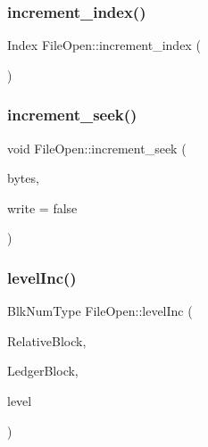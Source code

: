 \mbox{\label{class_file_open_abd29158f55f135ada0c5a0f25ee5ace6}} 
\subsubsection{\texorpdfstring{increment\+\_\+index()}{increment\_index()}}
{\footnotesize\ttfamily Index File\+Open\+::increment\+\_\+index (\begin{DoxyParamCaption}{ }\end{DoxyParamCaption})}

\mbox{\label{class_file_open_a8b178b10d2081d8c64a1218f11b9265a}} 
\subsubsection{\texorpdfstring{increment\+\_\+seek()}{increment\_seek()}}
{\footnotesize\ttfamily void File\+Open\+::increment\+\_\+seek (\begin{DoxyParamCaption}\item[{size\+\_\+t}]{bytes,  }\item[{bool}]{write = {\ttfamily false} }\end{DoxyParamCaption})}

\mbox{\label{class_file_open_a74e35be92bea88b55c4bd27210fc1e93}} 
\subsubsection{\texorpdfstring{level\+Inc()}{levelInc()}}
{\footnotesize\ttfamily Blk\+Num\+Type File\+Open\+::level\+Inc (\begin{DoxyParamCaption}\item[{size\+\_\+t}]{Relative\+Block,  }\item[{Blk\+Num\+Type}]{Ledger\+Block,  }\item[{short}]{level }\end{DoxyParamCaption})\hspace{0.3cm}{\ttfamily [private]}}

